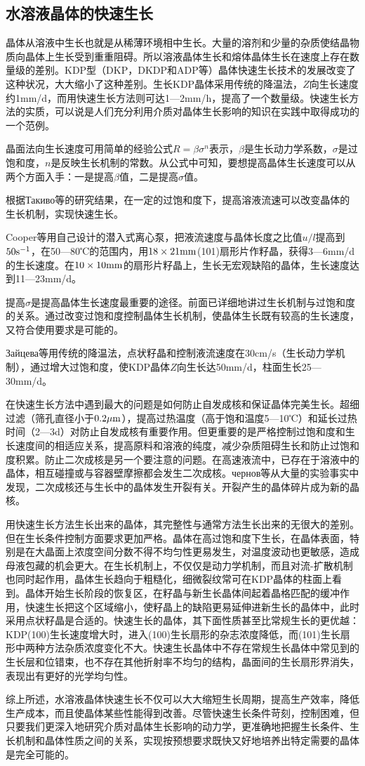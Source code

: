 \subsection{水溶液晶体的快速生长}
晶体从溶液中生长也就是从稀薄环境相中生长。大量的溶剂和少量的杂质使结晶物质向晶体上生长受到重重阻碍。所以溶液晶体生长和熔体晶体生长在速度上存在数量级的差别。KDP型（DKP，DKDP和ADP等）晶体快速生长技术的发展改变了这种状况，大大缩小了这种差别。生长KDP晶体采用传统的降温法，$Z$向生长速度约1mm/d，而用快速生长方法则可达1---2mm/h，提高了一个数量级。快速生长方法的实质，可以说是人们充分利用介质对晶体生长影响的知识在实践中取得成功的一个范例。

晶面法向生长速度可用简单的经验公式$R=\beta\sigma^n$表示，$\beta$是生长动力学系数，$\sigma$是过饱和度，$n$是反映生长机制的常数。从公式中可知，要想提高晶体生长速度可以从两个方面入手：一是提高$\beta$值，二是提高$\sigma$值。

根据{\timesnewroman Такиво}等的研究结果，在一定的过饱和度下，提高溶液流速可以改变晶体的生长机制，实现快速生长。

Cooper等用自己设计的潜入式离心泵，把液流速度与晶体长度之比值$u/l$提高到$\rm 50s^{-1}$，在50---80℃的范围内，用$\rm 18\times 21mm$(101)扇形片作籽晶，获得3---6mm/d的生长速度。在$10\times10\rm mm$的扇形片籽晶上，生长无宏观缺陷的晶体，生长速度达到11---23mm/d。

提高$\sigma$是提高晶体生长速度最重要的途径。前面已详细地讲过生长机制与过饱和度的关系。通过改变过饱和度控制晶体生长机制，使晶体生长既有较高的生长速度，又符合使用要求是可能的。

{\timesnewroman Зайцева}等用传统的降温法，点状籽晶和控制液流速度在30cm/s（生长动力学机制），通过增大过饱和度，使KDP晶体$Z$向生长达50mm/d，柱面生长25---30mm/d。

在快速生长方法中遇到最大的问题是如何防止自发成核和保证晶体完美生长。超细过滤（筛孔直径小于$0.2\rm\mu m$），提高过热温度（高于饱和温度5---10℃）和延长过热时间（2---3d）对防止自发成核有重要作用。但更重要的是严格控制过饱和度和生长速度间的相适应关系，提高原料和溶液的纯度，减少杂质阻碍生长和防止过饱和度积累。防止二次成核是另一个要注意的问题。在高速液流中，已存在于溶液中的晶体，相互碰撞或与容器壁摩擦都会发生二次成核。{\timesnewroman чернов}等从大量的实验事实中发现，二次成核还与生长中的晶体发生开裂有关。开裂产生的晶体碎片成为新的晶核。

用快速生长方法生长出来的晶体，其完整性与通常方法生长出来的无很大的差别。但在生长条件控制方面要求更加严格。晶体在高过饱和度下生长，在晶体表面，特别是在大晶面上浓度空间分数不得不均匀性更易发生，对温度波动也更敏感，造成母液包藏的机会更大。在生长机制上，不仅仅是动力学机制，而且对流-扩散机制也同时起作用，晶体生长趋向于粗糙化，细微裂纹常可在KDP晶体的柱面上看到。晶体开始生长阶段的恢复区，在籽晶与新生长晶体间起着晶格匹配的缓冲作用，快速生长把这个区域缩小，使籽晶上的缺陷更易延伸进新生长的晶体中，此时采用点状籽晶是合适的。快速生长的晶体，其下面性质甚至比常规生长的更优越：KDP(100)生长速度增大时，进入(100)生长扇形的杂志浓度降低，而(101)生长扇形中两种方法杂质浓度变化不大。快速生长晶体中不存在常规生长晶体中常见到的生长层和位错束，也不存在其他折射率不均匀的结构，晶面间的生长扇形界消失，表现出有更好的光学均匀性。

综上所述，水溶液晶体快速生长不仅可以大大缩短生长周期，提高生产效率，降低生产成本，而且使晶体某些性能得到改善。尽管快速生长条件苛刻，控制困难，但只要我们更深入地研究介质对晶体生长影响的动力学，更准确地把握生长条件、生长机制和晶体性质之间的关系，实现按预想要求既快又好地培养出特定需要的晶体是完全可能的。